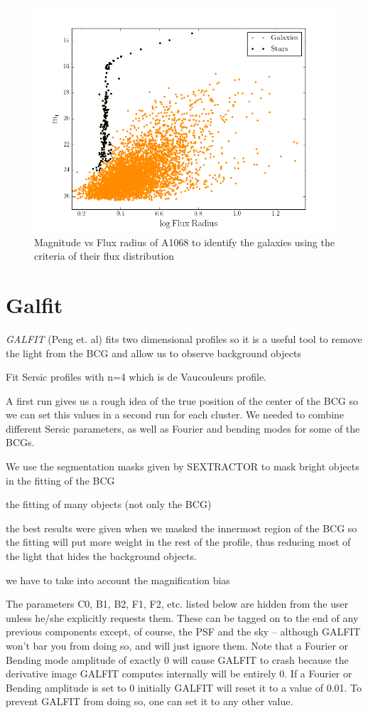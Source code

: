 \begin{figure}[H]
\centering
\includegraphics[width=12cm]{images/mag_vs_flux_rad.png}
\caption[Magnitude vs Flux radius of A1068]{Magnitude vs Flux radius of A1068 to identify the galaxies using the criteria of their flux distribution}
\end{figure}

\section{Galfit}

\textit{GALFIT} (Peng et. al) fits two dimensional profiles so it is a useful tool to remove the light from the BCG and allow us to observe background objects

Fit Sersic profiles with n=4 which is de Vaucouleurs profile. 

A first run gives us a rough idea of the true position of the center of the BCG so we can set this values in a second run for each cluster. We needed to combine different Sersic parameters, as well as Fourier and bending modes for some of the BCGs.

We use the segmentation masks given by SEXTRACTOR to mask bright objects in the fitting of the BCG

the fitting of many objects (not only the BCG)

the best results were given when we masked the innermost region of the BCG so the fitting will put more weight in the rest of the profile, thus reducing most of the light that hides the background objects.

we have to take into account the magnification bias

The parameters C0, B1, B2, F1, F2, etc. listed below are hidden from the user unless he/she explicitly requests them.  These can  be tagged on to the end of any previous components except, of course, the PSF and the sky -- although GALFIT won't bar you from doing so, and will just ignore them.  Note that a Fourier or Bending mode amplitude of exactly 0 will cause GALFIT to crash because the derivative image GALFIT computes internally will be entirely 0.  If a Fourier or Bending amplitude is set to 0 initially GALFIT will reset it to a value of 0.01.  To prevent GALFIT from doing so, one can set it to any 
other value.


